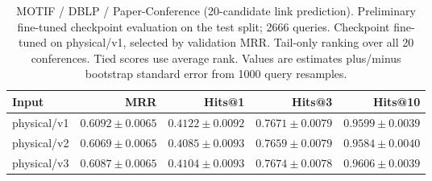 \begin{table}[t]
\centering
\small
\begin{tabular}{lrrrr}
\toprule
Input & MRR & Hits@1 & Hits@3 & Hits@10 \\
\midrule
physical/v1 & $0.6092 \pm 0.0065$ & $0.4122 \pm 0.0092$ & $0.7671 \pm 0.0079$ & $0.9599 \pm 0.0039$ \\
physical/v2 & $0.6069 \pm 0.0065$ & $0.4085 \pm 0.0093$ & $0.7659 \pm 0.0079$ & $0.9584 \pm 0.0040$ \\
physical/v3 & $0.6087 \pm 0.0065$ & $0.4104 \pm 0.0093$ & $0.7674 \pm 0.0078$ & $0.9606 \pm 0.0039$ \\
\bottomrule
\end{tabular}
\caption{MOTIF / DBLP / Paper-Conference (20-candidate link prediction). Preliminary fine-tuned checkpoint evaluation on the test split; 2666 queries. Checkpoint fine-tuned on physical/v1, selected by validation MRR. Tail-only ranking over all 20 conferences. Tied scores use average rank. Values are estimates plus/minus bootstrap standard error from 1000 query resamples.}
\label{tab:motif-paper_conference-link_prediction}
\end{table}
